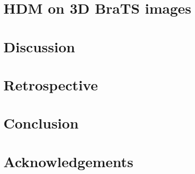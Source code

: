 \chapter{HDM on 3D BraTS images}


% 

\chapter{Discussion}


\chapter{Retrospective}


\chapter{Conclusion}


\chapter{Acknowledgements}

